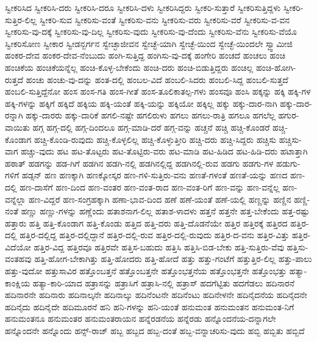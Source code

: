 {ಸ್ವೀಕರಿಸಿದ
ಸ್ವೀಕರಿಸಿ-ದರು
ಸ್ವೀಕರಿಸಿ-ದರೂ
ಸ್ವೀಕರಿಸಿ-ದಳು
ಸ್ವೀಕರಿಸಿದ್ದರು
ಸ್ವೀಕರಿ-ಸುತ್ತಾರೆ
ಸ್ವೀಕರಿಸುತ್ತಿದ್ದಳು
ಸ್ವೀಕರಿ-ಸುತ್ತಿರ-ಲಿಲ್ಲ
ಸ್ವೀಕರಿ-ಸುವ
ಸ್ವೀಕರಿಸು-ವಂತೆ
ಸ್ವೀಕರಿಸು-ವನು
ಸ್ವೀಕರಿಸು-ವರು
ಸ್ವೀಕರಿಸು-ವರೆ
ಸ್ವೀಕರಿಸು-ವ-ವನ
ಸ್ವೀಕರಿಸು-ವು-ದಕ್ಕೆ
ಸ್ವೀಕರಿಸು-ವು-ದಿಲ್ಲ
ಸ್ವೀಕರಿಸು-ವುದು
ಸ್ವೀಕರಿಸು-ವು-ದೆಂದು
ಸ್ವೀಕರಿಸು-ವೆನು
ಸ್ವೀಕರಿಸು-ವೆಯೊ
ಸ್ವೀಕರಿಸೋಣ
ಸ್ವೀಕಾರ
ಸ್ವೀಡನ್ಬರ್ಗನ
ಸ್ವೇಚ್ಛಾಜೀವನ
ಸ್ವೇಚ್ಛೆ-ಯಾಗಿ
ಸ್ವೇಚ್ಛೆ-ಯಿಂದ
ಸ್ವೇಚ್ಛೆ-ಯಿಂದಲೇ
ಸ್ವ್ವಾಮೀಜಿ
ಹಂಕರ-ದೇವ
ಹಂಕರ-ದೇವ-ನೆಂಬುದು
ಹಂಗಿ-ಸುತ್ತಿದ್ದ
ಹಂಗಿಸು-ವು-ದಕ್ಕೆ
ಹಂಗೇರಿ
ಹಂಚದೆ
ಹಂಚಲು
ಹಂಚಿ
ಹಂಚಿಕೆಯ
ಹಂಚಿಕೆಯನ್ನೆಲ್ಲ
ಹಂಚಿ-ಕೊಳ್ಳ-ಬೇಕೆಂದು
ಹಂಚಿ-ದರು
ಹಂಚಿ-ಬಿಡುತ್ತಿದ್ದರು
ಹಂಚಿಲ್ಲ
ಹಂಚಿ-ಹೋಗಿ-ರುತ್ತದೆ
ಹಂಚು
ಹಂಚು-ವು-ದನ್ನು
ಹಂತ-ದಲ್ಲಿ
ಹಂಬಲ-ವಿದೆ
ಹಂಬಲಿ-ಸಿದರು
ಹಂಬಲಿ-ಸಿದ್ದ
ಹಂಬಲಿ-ಸುತ್ತದೆ
ಹಂಬಲಿ-ಸುತ್ತಿದ್ದೆನೋ
ಹಂಸ
ಹಂಸ-ಗತಿ
ಹಂಸ-ಗೀತೆ
ಹಂಸ-ತೂಲಿಕಾತಲ್ಪ-ಗಳು
ಹಂಸವೂ
ಹಂಸಿ
ಹಕ್ಕನ್ನು
ಹಕ್ಕಿ
ಹಕ್ಕಿ-ಗಳ
ಹಕ್ಕಿ-ಗಳನ್ನು
ಹಕ್ಕಿಗೆ
ಹಕ್ಕಿದೆ
ಹಕ್ಕಿಯ
ಹಕ್ಕಿ-ಯಂತೆ
ಹಕ್ಕಿ-ಯನ್ನು
ಹಕ್ಕಿಯೋ
ಹಕ್ಕಿಲ್ಲ
ಹಕ್ಕು
ಹಕ್ಕು-ದಾರ-ನಾಗಿ
ಹಕ್ಕು-ದಾರ-ರನ್ನಾಗಿ
ಹಕ್ಕು-ದಾರರು
ಹಕ್ಕು-ದಾರಿಕೆ
ಹಗಲಿ-ನಷ್ಟೇ
ಹಗಲಿರುಳು
ಹಗಲು
ಹಗಲು-ರಾತ್ರಿ
ಹಗಲೂ
ಹಗಲೆಲ್ಲ
ಹಗುರ-ವಾಯಿತು
ಹಗ್ಗ
ಹಗ್ಗ-ದಲ್ಲಿ
ಹಗ್ಗ-ದಿಂದಲೂ
ಹಗ್ಗ-ಮಾಡಿ-ದರೆ
ಹಗ್ಗ-ವನ್ನು
ಹಚ್ಚನೆ
ಹಚ್ಚಿ
ಹಚ್ಚಿ-ಕೊಂಡರೆ
ಹಚ್ಚಿ-ಕೊಂಡಾಗ
ಹಚ್ಚಿ-ಕೊಂಡಿ-ರುವುದು
ಹಚ್ಚಿ-ಕೊಳ್ಳಲಿಲ್ಲ
ಹಚ್ಚಿ-ಕೊಳ್ಳುತ್ತೀರಿ
ಹಚ್ಚಿ-ದರು
ಹಚ್ಚಿ-ಸಿದ್ದರು
ಹಚ್ಚಿಸು
ಹಚ್ಚಿಸು-ವಾಗ
ಹಚ್ಚು-ವುದು
ಹಟ
ಹಟ-ತೊಟ್ಟರು
ಹಟ-ತೊಟ್ಟಿರು-ವರು
ಹಟ-ಮಾಡಿ
ಹಟ-ಹಿಡಿದ
ಹಟ-ಹಿಡಿ-ದರು
ಹಟಾತ್ತಾಗಿ
ಹಠಾತ್
ಹಡಗನ್ನು
ಹಡ-ಗಿಗೆ
ಹಡಗಿನ
ಹಡಗಿ-ನಲ್ಲಿ
ಹಡಗಿನಲ್ಲಿದ್ದ
ಹಡಗಿನಲ್ಲಿ-ರುವ
ಹಡಗು
ಹಡಗು-ಗಳ
ಹಡುಗು-ಗಳಿಗೆ
ಹಡ್ಸನ್
ಹಣ
ಹಣಕ್ಕಾಗಿ
ಹಣಕ್ಕೋಸ್ಕರ
ಹಣ-ಗಳಿ-ಸುತ್ತಿರು-ವನು
ಹಣತೆ-ಗಳಂತೆ
ಹಣತೆ-ಯನ್ನು
ಹಣದ
ಹಣ-ದಲ್ಲಿ
ಹಣ-ದಾಸೆಗೆ
ಹಣ-ದಿಂದ
ಹಣ-ವಂತರ
ಹಣ-ವಂತ-ರಾದ
ಹಣ-ವಂತ-ರಿಗೆ
ಹಣ-ವನ್ನು
ಹಣ-ವನ್ನೆಲ್ಲ
ಹಣ-ವನ್ನೆಲ್ಲಾ
ಹಣ-ವಿದ್ದರೆ
ಹಣ-ಸಂಗ್ರಹಕ್ಕಾಗಿ
ಹಣಾ-ಭಾವ-ದಿಂದ
ಹಣೆ
ಹಣೆ-ಯಂತೆ
ಹಣೆ-ಯಲ್ಲಿ
ಹಣ್ಣನ್ನು
ಹಣ್ಣಿನ
ಹಣ್ಣಿ-ನಂತೆ
ಹಣ್ಣು
ಹಣ್ಣು-ಗಳನ್ನು
ಹಣ್ಣೆಂದು
ಹತಾಶನಾಗ-ಲಿಲ್ಲ
ಹತಾಶ-ಳಾದಳು
ಹತ್ತನೆ
ಹತ್ತನೇ
ಹತ್ತ-ಬೇಕೆಂದು
ಹತ್ತ-ರಷ್ಟು
ಹತ್ತಾರು
ಹತ್ತಿ
ಹತ್ತಿ-ಕೊಂಡಾಗ
ಹತ್ತಿ-ಕೊಂಡು
ಹತ್ತಿದ
ಹತ್ತಿ-ದರು
ಹತ್ತಿ-ದೊಡನೆಯೇ
ಹತ್ತಿರ
ಹತ್ತಿರಕ್ಕೆ
ಹತ್ತಿರದ
ಹತ್ತಿರ-ದಲ್ಲಿ
ಹತ್ತಿರ-ದಲ್ಲಿದ್ದ
ಹತ್ತಿರ-ದಲ್ಲಿದ್ದಾನೆ
ಹತ್ತಿರ-ದಲ್ಲಿ-ರುವ
ಹತ್ತಿರ-ದಲ್ಲಿ-ರುವುದು
ಹತ್ತಿರ-ದ-ವನು
ಹತ್ತಿರ-ವಿತ್ತು
ಹತ್ತಿರ-ವಿದೆಯೋ
ಹತ್ತಿರ-ವಿದ್ದ
ಹತ್ತಿರವೂ
ಹತ್ತಿರವೇ
ಹತ್ತಿಸ-ಬಹುದು
ಹತ್ತಿಸಿ
ಹತ್ತಿಸಿ-ಬಿಡ-ಬೇಕು
ಹತ್ತಿ-ಸುತ್ತಿರು-ವೆವು
ಹತ್ತಿಸು-ವಂತಹವು
ಹತ್ತಿ-ಹೋಗ-ಬೇಕಾಗಿತ್ತು
ಹತ್ತಿ-ಹೋದರು
ಹತ್ತಿ-ಹೋದೆ
ಹತ್ತು
ಹತ್ತು-ಗಂಟೆಗೆ
ಹತ್ತುತ್ತಿರ-ಲಿಲ್ಲ
ಹತ್ತು-ಪಾಲು
ಹತ್ತು-ವುದೋ
ಹತ್ತುಸಾವಿರ
ಹತ್ತೊಂಬತ್ತನೆ
ಹತ್ತೊಂಬತ್ತನೇ
ಹತ್ತೊಂಭತ್ತನೆಯ
ಹತ್ತೊಂಭತ್ತನೇ
ಹತ್ತೊಂಭತ್ತು
ಹತ್ಯಾ-ಕಾಂಕ್ಷಿಯ
ಹತ್ಯಾ-ಕಾರಿ-ಯಾದ
ಹತ್ರಾಸನ್ನು
ಹತ್ರಾಸಿಗೆ
ಹತ್ರಾಸಿ-ನಲ್ಲಿ
ಹತ್ರಾಸ್
ಹದಗೆಟ್ಟಿತು
ಹದಗೆಡಲು
ಹದಿನಾರನೆ
ಹದಿನಾರನೇ
ಹದಿನಾರು
ಹದಿನಾಲ್ಕನೇ
ಹದಿನಾಲ್ಕು
ಹದಿನೆಂಟನೇ
ಹದಿನೆಂಟು
ಹದಿನೇಳನೇ
ಹದಿನೈದನೆಯ
ಹದಿನೈದನೇ
ಹದಿನೈದು
ಹದಿನೈದೇ
ಹದಿಮೂರನೆ
ಹನಿ
ಹನಿ-ಗಳನ್ನು
ಹನಿ-ಯಂತೆ
ಹನುಮಂತ
ಹನುಮಂತನ
ಹನುಮಂತ-ನಿಗೆ
ಹನುಮಂತನೂ
ಹನುಮಂತರ
ಹನುಮಂತರಾಯನ
ಹನ್ನೆರಡನೆಯ
ಹನ್ನೆರಡು
ಹನ್ನೊಂದನೆಯ-ದನ್ನಾಗಲೇ
ಹನ್ನೊಂದನೇ
ಹನ್ನೊಂದು
ಹನ್ಸ್-ರಾಜ್
ಹಬ್ಬ
ಹಬ್ಬದ
ಹಬ್ಬ-ದಂತೆ
ಹಬ್ಬ-ವನ್ನಾಚರಿಸು-ವುದು
ಹಬ್ಬಿ
ಹಬ್ಬಿತು
ಹಬ್ಬಿದೆ
}
